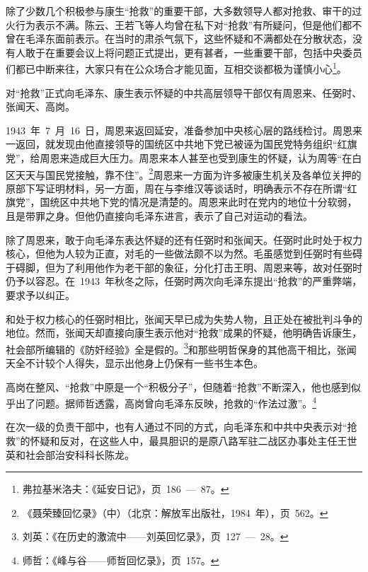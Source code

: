 除了少数几个积极参与康生“抢救”的重要干部，大多数领导人都对抢救、审干的过火行为表示不满。陈云、王若飞等人均曾在私下对“抢救”有所疑问，但是他们都不曾在毛泽东面前表示。在当时的肃杀气氛下，这些怀疑和不满都处在分散状态，没有人敢于在重要会议上将问题正式提出，更有甚者，一些重要干部，包括中央委员们都已中断来往，大家只有在公众场合才能见面，互相交谈都极为谨慎小心\footnote{弗拉基米洛夫：《延安日记》，页~186~—~87。}。

对“抢救”正式向毛泽东、康生表示怀疑的中共高层领导干部仅有周恩来、任弼时、张闻天、高岗。

1943~年~7~月~16~日，周恩来返回延安，准备参加中央核心层的路线检讨。周恩来一返回，就发现由他直接领导的国统区中共地下党已被诬为国民党特务组织“红旗党”，给周恩来造成巨大压力。周恩来本人甚至也受到康生的怀疑，认为周等“在白区天天与国民党接触，靠不住”。\footnote{《聂荣臻回忆录》（中）（北京：解放军出版社，1984~年），页~562。}周恩来一方面为许多被康生机关及各单位关押的原部下写证明材料，另一方面，周在与李维汉等谈话时，明确表示不存在所谓“红旗党”，国统区中共地下党的情况是清楚的。周恩来此时在党内的地位十分软弱，且是带罪之身。但他仍直接向毛泽东进言，表示了自己对运动的看法。

除了周恩来，敢于向毛泽东表达怀疑的还有任弼时和张闻天。任弼时此时处于权力核心，但他为人较为正直，对毛的一些做法颇不以为然。毛虽感觉到任弼时有些碍于碍脚，但为了利用他作为老干部的象征，分化打击王明、周恩来等，故对任弼时仍予以容忍。在~1943~年秋冬之际，任弼时两次向毛泽东提出“抢救”的严重弊端，要求予以纠正。

和处于权力核心的任弼时相比，张闻天早已成为失势人物，且正处在被批判斗争的地位。然而，张闻天却直接向康生表示他对“抢救”成果的怀疑，他明确告诉康生，社会部所编辑的《防奸经验》全是假的。\footnote{刘英：《在历史的激流中——刘英回忆录》，页~127~—~28。}和那些明哲保身的其他高干相比，张闻天全不计较个人得失，显示出他身上仍保有一些书生本色。

高岗在整风、“抢救”中原是一个“积极分子”，但随着“抢救”不断深入，他也感到似乎出了问题。据师哲透露，高岗曾向毛泽东反映，抢救的“作法过激”。\footnote{师哲：《峰与谷——师哲回忆录》，页~157。}

在次一级的负责干部中，也有人通过不同的方式，向毛泽东和中共中央表示对“抢救”的怀疑和反对，在这些人中，最具胆识的是原八路军驻二战区办事处主任王世英和社会部治安科科长陈龙。

